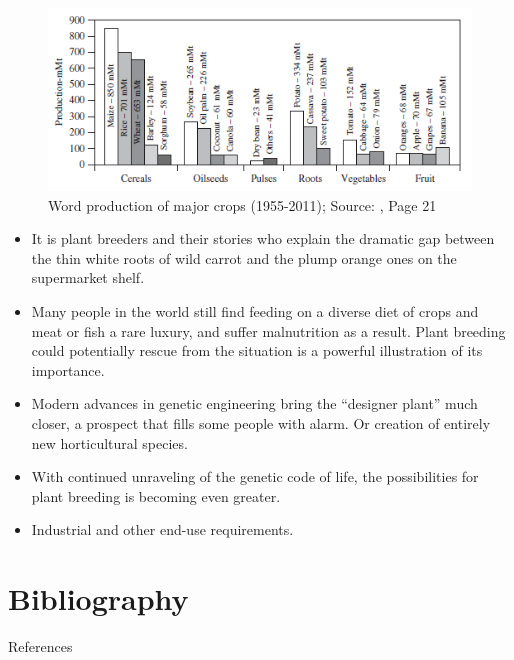 \documentclass[11pt,ignorenonframetext,aspectratio=169]{beamer}
\newif\ifbibliography
\providecommand{\tightlist}{%
  \setlength{\itemsep}{0pt}\setlength{\parskip}{0pt}}
\begin{document}
\begin{frame}{}
\protect\hypertarget{section-19}{}
\begin{figure}
\includegraphics[width=0.5\linewidth]{./images/world_production_of_major_crops} \caption{Word production of major crops (1955-2011); Source: \cite{brown2014plant}, Page 21}\label{fig:world-production-major}
\end{figure}

\small

\begin{itemize}
\tightlist
\item
  It is plant breeders and their stories who explain the dramatic gap
  between the thin white roots of wild carrot and the plump orange ones
  on the supermarket shelf.
\item
  Many people in the world still find feeding on a diverse diet of crops
  and meat or fish a rare luxury, and suffer malnutrition as a result.
  Plant breeding could potentially rescue from the situation is a
  powerful illustration of its importance.
\item
  Modern advances in genetic engineering bring the ``designer plant''
  much closer, a prospect that fills some people with alarm. Or creation
  of entirely new horticultural species.
\item
  With continued unraveling of the genetic code of life, the
  possibilities for plant breeding is becoming even greater.
\item
  Industrial and other end-use requirements.
\end{itemize}
\end{frame}

\hypertarget{bibliography}{%
\section{Bibliography}\label{bibliography}}

\begin{frame}{References}
\protect\hypertarget{references}{}
\end{frame}


  \begin{frame}[allowframebreaks]{}
  \bibliographytrue
  \printbibliography[heading=none]
  \end{frame}
\end{document}
